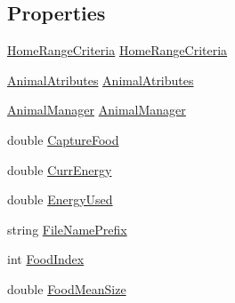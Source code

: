 \subsection*{Properties}
\begin{DoxyCompactItemize}
\item 
\hyperlink{class_s_e_a_r_c_h_1_1_home_range_criteria}{Home\-Range\-Criteria} \hyperlink{class_s_e_a_r_c_h_1_1_animal_acf76d8a9bcf386cc2a9720d10149d0a2}{Home\-Range\-Criteria}
\item 
\hyperlink{class_s_e_a_r_c_h_1_1_animal_atributes}{Animal\-Atributes} \hyperlink{class_s_e_a_r_c_h_1_1_animal_afc8fe17408aa73f7a31f3e2409be79c5}{Animal\-Atributes}
\item 
\hyperlink{class_s_e_a_r_c_h_1_1_animal_manager}{Animal\-Manager} \hyperlink{class_s_e_a_r_c_h_1_1_animal_a6a754d946c281c7e4d8f010c3b564223}{Animal\-Manager}
\item 
double \hyperlink{class_s_e_a_r_c_h_1_1_animal_a2e672fd9d06e4dac3d5f9c6f19c0b914}{Capture\-Food}
\item 
double \hyperlink{class_s_e_a_r_c_h_1_1_animal_ae8c02d56316874b56366bd7043d968f8}{Curr\-Energy}
\item 
double \hyperlink{class_s_e_a_r_c_h_1_1_animal_af1d5e2abc62c1e11699c2733000df86b}{Energy\-Used}
\item 
string \hyperlink{class_s_e_a_r_c_h_1_1_animal_ad354a9e9764c54e13a60a2a2555dee5f}{File\-Name\-Prefix}
\item 
int \hyperlink{class_s_e_a_r_c_h_1_1_animal_a8f46a01a6a525b050106b7c33e23a6f6}{Food\-Index}
\item 
double \hyperlink{class_s_e_a_r_c_h_1_1_animal_a047d41dbaec46762ba1d92f6a6658170}{Food\-Mean\-Size}
\item 

\end{DoxyCompactItemize}

